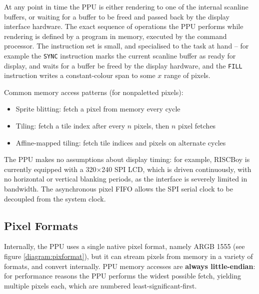 At any point in time the PPU is either rendering to one of the internal scanline buffers, or waiting for a buffer to be freed and passed back by the display interface hardware. The exact sequence of operations the PPU performs while rendering is defined by a program in memory, executed by the command processor. The instruction set is small, and specialised to the task at hand -- for example the {\tt SYNC} instruction marks the current scanline buffer as ready for display, and waits for a buffer be freed by the display hardware, and the {\tt FILL} instruction writes a constant-colour span to some $x$ range of pixels.

Common memory access patterns (for nonpaletted pixels):

\begin{itemize}
	\item Sprite blitting: fetch a pixel from memory every cycle
	\item Tiling: fetch a tile index after every $n$ pixels, then $n$ pixel fetches
	\item Affine-mapped tiling: fetch tile indices and pixels on alternate cycles
\end{itemize}


The PPU makes no assumptions about display timing: for example, RISCBoy is currently equipped with a 320$\times$240 SPI LCD, which is driven continuously, with no horizontal or vertical blanking periods, as the interface is severely limited in bandwidth. The asynchronous pixel FIFO allows the SPI serial clock to be decoupled from the system clock.

\subsection{Pixel Formats}

Internally, the PPU uses a single native pixel format, namely ARGB 1555 (see figure \ref{diagram:pixformat}), but it can stream pixels from memory in a variety of formats, and convert internally. PPU memory accesses are \textbf{always little-endian}: for performance reasons the PPU performs the widest possible fetch, yielding multiple pixels each, which are numbered least-significant-first.

